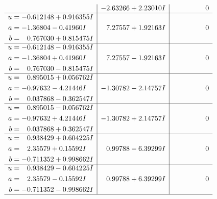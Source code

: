 \documentclass[1p]{elsarticle_modified}
\theoremstyle{definition}
\begin{document}
$$\begin{array}{c|c|c}
 & -2.63266 + 2.23010 I & \phantom{-0.000000 } 0 \\ \hline\begin{aligned}
u &= -0.612148 + 0.916355 I \\
a &= -1.36804 - 0.41960 I \\
b &= \phantom{-}0.767030 + 0.815475 I\end{aligned}
 & \phantom{-}7.27557 + 1.92163 I & \phantom{-0.000000 } 0 \\ \hline\begin{aligned}
u &= -0.612148 - 0.916355 I \\
a &= -1.36804 + 0.41960 I \\
b &= \phantom{-}0.767030 - 0.815475 I\end{aligned}
 & \phantom{-}7.27557 - 1.92163 I & \phantom{-0.000000 } 0 \\ \hline\begin{aligned}
u &= \phantom{-}0.895015 + 0.056762 I \\
a &= -0.97632 - 4.21446 I \\
b &= \phantom{-}0.037868 - 0.362547 I\end{aligned}
 & -1.30782 - 2.14757 I & \phantom{-0.000000 } 0 \\ \hline\begin{aligned}
u &= \phantom{-}0.895015 - 0.056762 I \\
a &= -0.97632 + 4.21446 I \\
b &= \phantom{-}0.037868 + 0.362547 I\end{aligned}
 & -1.30782 + 2.14757 I & \phantom{-0.000000 } 0 \\ \hline\begin{aligned}
u &= \phantom{-}0.938429 + 0.604225 I \\
a &= \phantom{-}2.35579 + 0.15592 I \\
b &= -0.711352 + 0.998662 I\end{aligned}
 & \phantom{-}0.99788 - 6.39299 I & \phantom{-0.000000 } 0 \\ \hline\begin{aligned}
u &= \phantom{-}0.938429 - 0.604225 I \\
a &= \phantom{-}2.35579 - 0.15592 I \\
b &= -0.711352 - 0.998662 I\end{aligned}
 & \phantom{-}0.99788 + 6.39299 I & \phantom{-0.000000 } 0\\
 \hline 
 \end{array}$$\newpage$$\begin{array}{c|c|c}  

\end{array}$$
\end{document}
